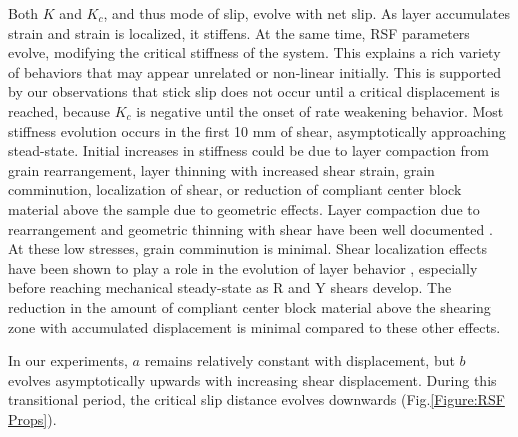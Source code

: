 \documentclass[11pt]{article}
\begin{document}
Both $K$ and $K_c$, and thus mode of slip, evolve with net slip. As layer
accumulates strain and strain is localized, it stiffens. At the same time, RSF
parameters evolve, modifying the critical stiffness of the system. This explains
a rich variety of behaviors that may appear unrelated or non-linear initially.
This is supported by our observations that stick slip does not occur until a
critical displacement is reached, because $K_c$ is negative until the onset of rate
weakening behavior. Most stiffness evolution occurs in the first 10 mm of shear,
asymptotically approaching stead-state. Initial increases in stiffness could be
due to layer compaction from grain rearrangement, layer thinning with increased
shear strain, grain comminution, localization of shear, or reduction of
compliant center block material above the sample due to geometric effects. Layer
compaction due to rearrangement and geometric thinning with shear have been well
documented \cite{Scott:1994}.  At these low stresses, grain comminution is
minimal. Shear localization effects have been shown to play a role in the
evolution of layer behavior \cite{Logan:1992}, especially before reaching
mechanical steady-state as R and Y shears develop. The reduction in the amount
of compliant center block material above the shearing zone with accumulated
displacement is minimal compared to these other effects.

In our experiments, $a$ remains relatively constant with displacement, but $b$
evolves asymptotically upwards with increasing shear displacement. During this
transitional period, the critical slip distance evolves downwards
(Fig.\ref{Figure:RSF Props}).
\end{document}
